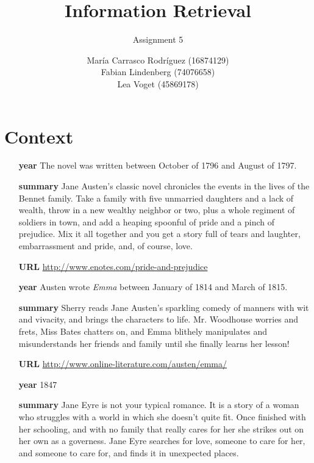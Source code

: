 \documentclass[a4paper,11pt,oneside]{book}
\title{Information Retrieval }
\subtitle{Assignment 5}
\author{ María Carrasco Rodríguez (16874129) \\
		Fabian Lindenberg (74076658)\\
		Lea Voget (45869178)}
\begin{document}
\kostspieligmaketitle


\chapter{Context}
\begin{description} \vskip 1cm
\item [\underline{{\it Pride and Prejudice} by Jane Austen}]  
	\begin{itemize}
	\item [{\bf year}] The novel was written between October of 1796 and August of 1797.
	\item [{\bf summary}] Jane Austen’s classic novel chronicles the events in the lives of the Bennet family. Take a family with five unmarried daughters and a lack of wealth, throw in a new wealthy neighbor or two, plus a whole regiment of soldiers in town, and add a heaping spoonful of pride and a pinch of prejudice. Mix it all together and you get a story full of tears and laughter, embarrassment and pride, and, of course, love.
	\item [{\bf URL}] \url{http://www.enotes.com/pride-and-prejudice}
	\end{itemize} 
\item [\underline{{\it Emma} by Jane Austen}]  
	\begin{itemize}
	\item [{\bf year}] Austen wrote {\it Emma} between January of 1814 and March of 1815.
	\item [{\bf summary}] Sherry reads Jane Austen’s sparkling comedy of manners with wit and vivacity, and brings the characters to life. Mr. Woodhouse worries and frets, Miss Bates chatters on, and Emma blithely manipulates and misunderstands her friends and family until she finally learns her lesson! 
	\item [{\bf URL}] \url{http://www.online-literature.com/austen/emma/}
	\end{itemize} 
\item [\underline{{\it Jane Eyre} by Charlotte Bronte}] 
	\begin{itemize}
	\item [{\bf year}] 1847
	\item [{\bf summary}] Jane Eyre is not your typical romance. It is a story of a woman who struggles with a world in which she doesn’t quite fit. Once finished with her schooling, and with no family that really cares for her she strikes out on her own as a governess. Jane Eyre searches for love, someone to care for her, and someone to care for, and finds it in unexpected places.

\end{itemize}
\end{description}
\end{document}
